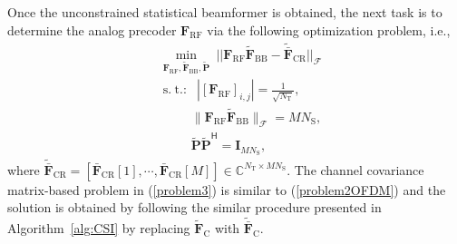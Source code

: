 \documentclass[journal,10pt]{IEEEtran}
\DeclareMathOperator*{\minimize}{min} %
\DeclareMathOperator*{\subjectto}{s.\hspace{3pt} t.:\hspace{3pt}} %
\begin{document}
{		Once the unconstrained statistical beamformer is obtained, the next task is to determine the analog precoder $\mathbf{F}_\mathrm{RF}$ via the following optimization problem, i.e.,
		\begin{align}
		\label{problem3}
		&\underset{\mathbf{F}_\mathrm{RF},\widetilde{\mathbf{F}}_\mathrm{BB},\widetilde{\mathbf{P}}}{\minimize}\hspace{3pt} \big|\big|   \mathbf{F}_\mathrm{RF}\widetilde{\mathbf{F}}_\mathrm{BB} - \widetilde{\bar{\mathbf{F}}}_\mathrm{CR} \big|\big|_\mathcal{F}
		\nonumber \\
		&\subjectto \; |[\mathbf{F}_\mathrm{RF}]_{i,j} |=\frac{1}{\sqrt{N_\mathrm{T}}},  \nonumber \\
		&\hspace{30pt}\| \mathbf{{F}}_\mathrm{RF}\widetilde{\mathbf{F}}_\mathrm{BB}\|_{\mathcal{F}}  =  MN_\mathrm{S}, \nonumber\\
		& \hspace{30pt}\widetilde{\mathbf{P}}\widetilde{\mathbf{P}}^\textsf{H} = \mathbf{I}_{MN_\mathrm{S}},
		\end{align}
		where $\widetilde{\bar{\mathbf{F}}}_\mathrm{CR} = [\bar{\mathbf{F}}_\mathrm{CR}[1],\cdots, \bar{\mathbf{F}}_\mathrm{CR}[M]]\in \mathbb{C}^{N_\mathrm{T}\times MN_\mathrm{S}}$. The channel covariance matrix-based problem in (\ref{problem3}) is similar to (\ref{problem2OFDM}) and the solution is obtained by following the similar procedure presented in Algorithm~\ref{alg:CSI} by replacing $\widetilde{\mathbf{F}}_\mathrm{C}$ with $\widetilde{\bar{\mathbf{F}}}_\mathrm{C}$.}
	
\end{document}
